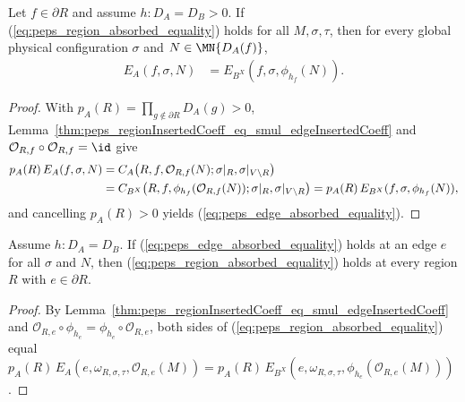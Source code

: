 \begin{lemma}%
    \label{thm:peps_edgeInsertedCoeff_eq_applyGauge_of_region}
    \leanok
    Let $f\in\partial R$ and assume $h:D_A=D_B>0$. If (\ref{eq:peps_region_absorbed_equality}) holds for all $M,\sigma,\tau$, then for every global physical configuration $\sigma$ and $N\in\MN{D_A(f)}$,
    \begin{align}
        E_A(f,\sigma,N)
         & =
        E_{B^X}(f,\sigma,\phi_{h_f}(N)).
        \label{eq:peps_edge_absorbed_equality}
    \end{align}
\end{lemma}
\begin{proof}\leanok
    With $p_A(R)=\prod_{g\notin\partial R}D_A(g)>0$, Lemma~\ref{thm:peps_regionInsertedCoeff_eq_smul_edgeInsertedCoeff} and $\mathcal O_{R,f}\circ\mathcal O_{R,f}=\id$ give
    \begin{align}
        p_A(R)\,E_A(f,\sigma,N)
         & =C_A\bigl(R,f,\mathcal O_{R,f}(N);\sigma|_R,\sigma|_{V\setminus R}\bigr) \notag          \\
         & =C_{B^X}\bigl(R,f,\phi_{h_f}(\mathcal O_{R,f}(N));\sigma|_R,\sigma|_{V\setminus R}\bigr)
        =p_A(R)\,E_{B^X}(f,\sigma,\phi_{h_f}(N)),
        \notag
    \end{align}
    and cancelling $p_A(R)>0$ yields (\ref{eq:peps_edge_absorbed_equality}).
\end{proof}

\begin{lemma}%
    \label{thm:peps_regionInsertedCoeff_eq_applyGauge_of_edge}
    \leanok
    Assume $h:D_A=D_B$. If (\ref{eq:peps_edge_absorbed_equality}) holds at an edge $e$ for all $\sigma$ and $N$, then (\ref{eq:peps_region_absorbed_equality}) holds at every region $R$ with $e\in\partial R$.
\end{lemma}
\begin{proof}\leanok
    By Lemma~\ref{thm:peps_regionInsertedCoeff_eq_smul_edgeInsertedCoeff} and $\mathcal O_{R,e}\circ\phi_{h_e}=\phi_{h_e}\circ\mathcal O_{R,e}$, both sides of (\ref{eq:peps_region_absorbed_equality}) equal $p_A(R)\,E_A(e,\omega_{R,\sigma,\tau},\mathcal O_{R,e}(M))=p_A(R)\,E_{B^X}(e,\omega_{R,\sigma,\tau},\phi_{h_e}(\mathcal O_{R,e}(M)))$.
\end{proof}
